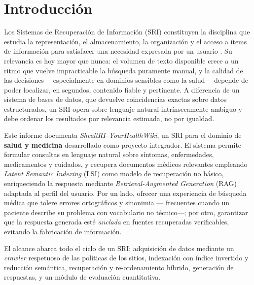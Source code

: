 \documentclass[runningheads,a4paper,14pts]{llncs}
\begin{document}
	\setcounter{tocdepth}{4}
	\tableofcontents
	\newpage
	
	\section{Introducción}
	
	Los Sistemas de Recuperación de Información (SRI) constituyen la disciplina que
	estudia la representación, el almacenamiento, la organización y el acceso a
	ítems de información para satisfacer una necesidad expresada por un usuario
	\cite{manning2008,baeza1999}. Su relevancia es hoy mayor que nunca: el volumen
	de texto disponible crece a un ritmo que vuelve impracticable la búsqueda
	puramente manual, y la calidad de las decisiones ---especialmente en dominios
	sensibles como la salud--- depende de poder localizar, en segundos, contenido
	fiable y pertinente. A diferencia de un sistema de bases de datos, que devuelve
	coincidencias exactas sobre datos estructurados, un SRI opera sobre lenguaje
	natural intrínsecamente ambiguo y debe ordenar los resultados por relevancia
	estimada, no por igualdad.
	
	Este informe documenta \emph{ShealtRI--YourHealthWiki}, un SRI para el dominio de
	\textbf{salud y medicina} desarrollado como proyecto integrador. El sistema
	permite formular consultas en lenguaje natural sobre síntomas, enfermedades,
	medicamentos y cuidados, y recupera documentos médicos relevantes empleando
	\emph{Latent Semantic Indexing} (LSI) como modelo de recuperación no básico,
	enriqueciendo la respuesta mediante \emph{Retrieval-Augmented Generation} (RAG)
	adaptada al perfil del usuario. Por un lado, ofrecer una
	experiencia de búsqueda médica que tolere errores ortográficos y sinonimia ---
	frecuentes cuando un paciente describe su problema con vocabulario no técnico---;
	por otro, garantizar que la respuesta generada esté \emph{anclada} en fuentes
	recuperadas verificables, evitando la fabricación de información.
	
	El alcance abarca todo el ciclo de un SRI: adquisición de datos mediante un
	\emph{crawler} respetuoso de las políticas de los sitios, indexación con índice
	invertido y reducción semántica, recuperación y re-ordenamiento híbrido,
	generación de respuestas, y un módulo de evaluación cuantitativa.
	
\end{document}

